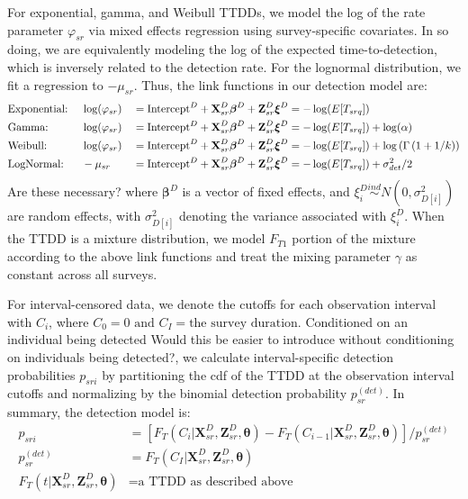 \documentclass[useAMS,usenatbib,referee,12pt]{article}
\newcommand{\jarad}[1]{{\color{red} #1}}
\begin{document}
For exponential, gamma, and Weibull TTDDs, we model the log of the rate parameter $\varphi_{sr}$ via mixed effects regression using survey-specific covariates.  In so doing, we are equivalently modeling the log of the expected time-to-detection, which is inversely related to the detection rate.  For the lognormal distribution, we fit a regression to $-\mu_{sr}$.  Thus, the link functions in our detection model are:
\begin{alignat}{3}
&\text{Exponential:\;} &&\log(\varphi_{sr}) &&= \text{Intercept}^D + \textbf{X}_{sr}^D\boldsymbol{\beta}^D + \textbf{Z}_{sr}^D\boldsymbol{\xi}^D = -\log(E[T_{srq}])\\
&\text{Gamma:} &&\log(\varphi_{sr}) &&= \text{Intercept}^D + \textbf{X}_{sr}^D\boldsymbol{\beta}^D + \textbf{Z}_{sr}^D\boldsymbol{\xi}^D = -\log(E[T_{srq}]) + \log(\alpha)\\
&\text{Weibull:}  &&\log(\varphi_{sr}) &&= \text{Intercept}^D + \textbf{X}_{sr}^D\boldsymbol{\beta}^D + \textbf{Z}_{sr}^D\boldsymbol{\xi}^D = -\log(E[T_{srq}]) + \log\left(\Gamma\left(1 + 1/k\right)\right)\\
&\text{LogNormal:} &&-\mu_{sr} &&= \text{Intercept}^D + \textbf{X}_{sr}^D\boldsymbol{\beta}^D + \textbf{Z}_{sr}^D\boldsymbol{\xi}^D = -\log(E[T_{srq}]) + \sigma_{det}^2/2
\end{alignat}
\jarad{Are these necessary?}
where $\boldsymbol{\beta}^D$ is a vector of fixed effects, and $\xi_i^D \overset{ind}{\sim} N(0,\sigma_{D[i]}^2)$ are random effects, with $\sigma_{D[i]}^2$ denoting the variance associated with $\xi_i^D$.  When the TTDD is a mixture distribution, we model $F_{T1}$ portion of the mixture according to the above link functions and treat the mixing parameter $\gamma$ as constant across all surveys.

For interval-censored data, we denote the cutoffs for each observation interval with $C_i$, where $C_0 = 0 \text{ and } C_I = \text{the survey duration}$.  Conditioned on an individual being detected \jarad{Would this be easier to introduce without conditioning on individuals being detected?}, we calculate interval-specific detection probabilities $p_{sri}$ by partitioning the cdf of the TTDD at the observation interval cutoffs and normalizing by the binomial detection probability $p_{sr}^{(det)}$.  In summary, the detection model is:
\begin{align}
p_{sri} &= \left[F_T(C_i|\textbf{X}_{sr}^D, \textbf{Z}_{sr}^D, \boldsymbol{\theta}) - F_T(C_{i-1}|\textbf{X}_{sr}^D, \textbf{Z}_{sr}^D, \boldsymbol{\theta})\right]\big/p_{sr}^{(det)}\\
\label{eq:pdet}p_{sr}^{(det)} &= F_T(C_I|\textbf{X}_{sr}^D, \textbf{Z}_{sr}^D, \boldsymbol{\theta})\\
F_T(t|\textbf{X}_{sr}^D, \textbf{Z}_{sr}^D, \boldsymbol{\theta}) &= \text{a TTDD as described above}
\end{align}
\end{document}
